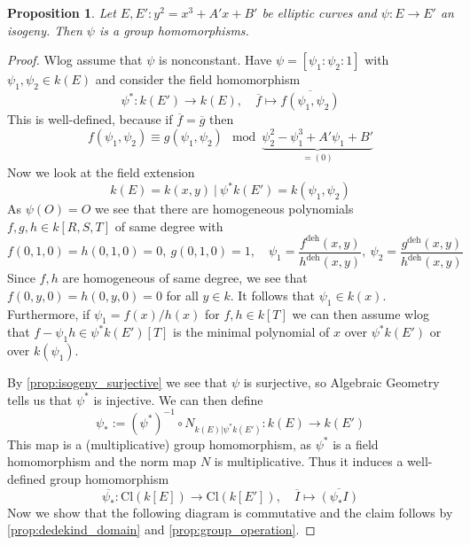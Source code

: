 \documentclass{scrartcl}
\renewcommand{\O}{O}
\newtheorem{prop}{Proposition}[section]
\theoremstyle{definition}
\begin{document}
\begin{prop}
    \label{prop:isogeny_homomorphism}
    Let $E, E': y^2 = x^3 + A'x + B'$ be elliptic curves and $\psi: E \to E'$ an isogeny. Then $\psi$ is a group homomorphisms.
\end{prop}
\begin{proof}
    Wlog assume that $\psi$ is nonconstant.
    Have $\psi = [\psi_1 : \psi_2 : 1]$ with $\psi_1, \psi_2 \in k(E)$ and consider the field homomorphism
    \begin{equation*}
        \psi^*: k(E') \to k(E), \quad \overline{f} \mapsto \overline{f( \psi_1, \psi_2 )}
    \end{equation*}
    This is well-defined, because if $\overline{f} = \overline{g}$ then
    \begin{equation*}
        f(\psi_1, \psi_2) \equiv g(\psi_1, \psi_2) \mod \underbrace{\psi_2^2 - \psi_1^3 + A'\psi_1 + B'}_{= (0)}
    \end{equation*}
    Now we look at the field extension 
    \begin{equation*}
        k(E) = k(x, y) \ | \ \psi^*k(E') = k(\psi_1, \psi_2)
    \end{equation*}
    As $\psi(\O) = \O$ we see that there are homogeneous polynomials $f, g, h \in k[R, S, T]$ of same degree with
    \begin{equation*}
        f(0, 1, 0) = h(0, 1, 0) = 0, \ g(0, 1, 0) = 1, \quad \psi_1 = \frac {f^{\mathrm{deh}}(x, y)} {h^{\mathrm{deh}}(x, y)}, \ \psi_2 = \frac {g^{\mathrm{deh}}(x, y)} {h^{\mathrm{deh}}(x, y)}
    \end{equation*}
    Since $f, h$ are homogeneous of same degree, we see that $f(0, y, 0) = h(0, y, 0) = 0$ for all $y \in k$.
    It follows that $\psi_1 \in k(x)$. 
    Furthermore, if $\psi_1 = f(x)/h(x)$ for $f, h \in k[T]$ we can then assume wlog that $f - \psi_1 h \in \psi^*k(E')[T]$ is the minimal polynomial of $x$ over $\psi^*k(E')$ or over $k(\psi_1)$.

    By \ref{prop:isogeny_surjective} we see that $\psi$ is surjective, so Algebraic Geometry tells us that $\psi^*$ is injective.
    We can then define
    \begin{equation*}
        \psi_* := \left(\psi^*\right)^{-1} \circ N_{k(E) | \psi^*k(E')}: k(E) \to k(E')
    \end{equation*}
    This map is a (multiplicative) group homomorphism, as $\psi^*$ is a field homomorphism and the norm map $N$ is multiplicative.
    Thus it induces a well-defined group homomorphism
    \begin{equation*}
        \overline{\psi_*}: \mathrm{Cl}(k[E]) \to \mathrm{Cl}(k[E']), \quad \overline{I} \mapsto \overline{(\psi_*I)}
    \end{equation*}
    Now we show that the following diagram is commutative and the claim follows by \ref{prop:dedekind_domain} and \ref{prop:group_operation}.
    

\end{proof}
\end{document}

